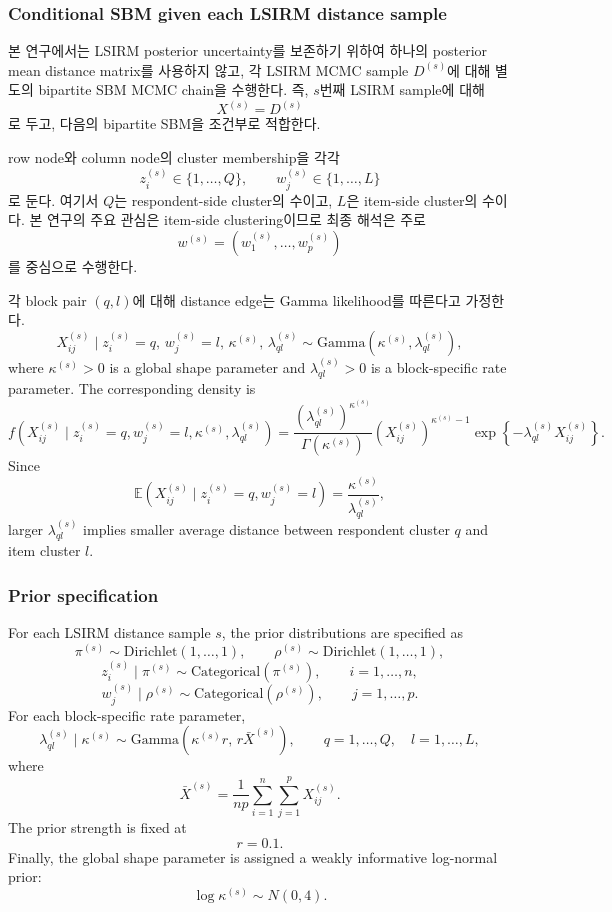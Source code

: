 \documentclass[A4paper,11pt]{article}
\begin{document}
\subsubsection{Conditional SBM given each LSIRM distance sample}

본 연구에서는 LSIRM posterior uncertainty를 보존하기 위하여 하나의 posterior mean distance matrix를
사용하지 않고, 각 LSIRM MCMC sample $D^{(s)}$에 대해 별도의 bipartite SBM MCMC chain을 수행한다.
즉, $s$번째 LSIRM sample에 대해
\[
X^{(s)} = D^{(s)}
\]
로 두고, 다음의 bipartite SBM을 조건부로 적합한다.

row node와 column node의 cluster membership을 각각
\[
z_i^{(s)} \in \{1,\ldots,Q\},
\qquad
w_j^{(s)} \in \{1,\ldots,L\}
\]
로 둔다. 여기서 $Q$는 respondent-side cluster의 수이고, $L$은 item-side cluster의 수이다.
본 연구의 주요 관심은 item-side clustering이므로 최종 해석은 주로
\[
w^{(s)} = \left(w_1^{(s)},\ldots,w_p^{(s)}\right)
\]
를 중심으로 수행한다.

각 block pair $(q,l)$에 대해 distance edge는 Gamma likelihood를 따른다고 가정한다.
\[
X^{(s)}_{ij}
\mid
z_i^{(s)}=q,\,
w_j^{(s)}=l,\,
\kappa^{(s)},\,
\lambda_{ql}^{(s)}
\sim
\mathrm{Gamma}\left(\kappa^{(s)}, \lambda_{ql}^{(s)}\right),
\]
where $\kappa^{(s)} > 0$ is a global shape parameter and
$\lambda_{ql}^{(s)} > 0$ is a block-specific rate parameter. The corresponding density is
\[
f\left(X^{(s)}_{ij} \mid z_i^{(s)}=q,w_j^{(s)}=l,\kappa^{(s)},\lambda_{ql}^{(s)}\right)
=
\frac{\left(\lambda_{ql}^{(s)}\right)^{\kappa^{(s)}}}{\Gamma(\kappa^{(s)})}
\left(X^{(s)}_{ij}\right)^{\kappa^{(s)}-1}
\exp\left\{-\lambda_{ql}^{(s)}X^{(s)}_{ij}\right\}.
\]
Since
\[
\mathbb{E}\left(X^{(s)}_{ij} \mid z_i^{(s)}=q,w_j^{(s)}=l\right)
=
\frac{\kappa^{(s)}}{\lambda_{ql}^{(s)}},
\]
larger $\lambda_{ql}^{(s)}$ implies smaller average distance between respondent cluster $q$ and item cluster $l$.

\subsubsection{Prior specification}

For each LSIRM distance sample $s$, the prior distributions are specified as
\[
\pi^{(s)} \sim \mathrm{Dirichlet}(1,\ldots,1),
\qquad
\rho^{(s)} \sim \mathrm{Dirichlet}(1,\ldots,1),
\]
\[
z_i^{(s)} \mid \pi^{(s)} \sim \mathrm{Categorical}(\pi^{(s)}),
\qquad
i=1,\ldots,n,
\]
\[
w_j^{(s)} \mid \rho^{(s)} \sim \mathrm{Categorical}(\rho^{(s)}),
\qquad
j=1,\ldots,p.
\]
For each block-specific rate parameter,
\[
\lambda_{ql}^{(s)} \mid \kappa^{(s)}
\sim
\mathrm{Gamma}\left(\kappa^{(s)} r,\, r\bar X^{(s)}\right),
\qquad
q=1,\ldots,Q,\quad l=1,\ldots,L,
\]
where
\[
\bar X^{(s)}
=
\frac{1}{np}
\sum_{i=1}^n
\sum_{j=1}^p
X^{(s)}_{ij}.
\]
The prior strength is fixed at
\[
r = 0.1.
\]
Finally, the global shape parameter is assigned a weakly informative log-normal prior:
\[
\log \kappa^{(s)} \sim N(0,4).
\]
\end{document}
